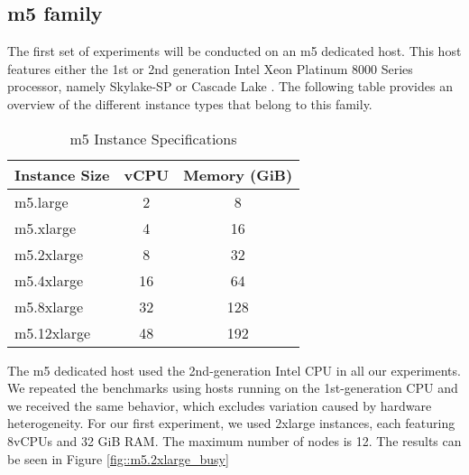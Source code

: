 \subsection{m5 family}
The first set of experiments will be conducted on an m5 dedicated host. This host features either the 
1st or 2nd generation Intel Xeon Platinum 8000 Series processor, namely Skylake-SP or Cascade Lake 
\cite{aws_m5_instances}. The following table provides an overview of the 
different instance types that belong to this family. 
\begin{table}[H]
\centering
\begin{tabular}{lcc}
\hline
\textbf{Instance Size} & \textbf{vCPU} & \textbf{Memory (GiB)} \\
\hline
m5.large     & 2  & 8    \\
m5.xlarge    & 4  & 16   \\
m5.2xlarge   & 8  & 32   \\
m5.4xlarge   & 16 & 64   \\
m5.8xlarge   & 32 & 128  \\
m5.12xlarge  & 48 & 192  \\
\hline
\end{tabular}
\caption{m5 Instance Specifications \cite{aws_m5_instances}}
\end{table}
\noindent
The m5 dedicated host used the 2nd-generation Intel CPU in all our experiments. 
We repeated the benchmarks using hosts running on the 1st-generation CPU and we received the same
behavior, which excludes variation caused by hardware heterogeneity. 
For our first experiment, we used 2xlarge instances, each featuring 8vCPUs and 32 GiB RAM. 
The maximum number of nodes is 12. The results can 
be seen in Figure \ref{fig::m5.2xlarge_busy}

